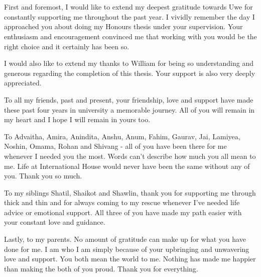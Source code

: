 \chapter*{}

First and foremost, I would like to extend my deepest gratitude towards Uwe for constantly supporting me throughout the past year. I vividly remember the day I approached you about doing my Honours thesis under your supervision. Your enthusiasm and encouragement convinced me that working with you would be the right choice and it certainly has been so. 

I would also like to extend my thanks to William for being so understanding and generous regarding the completion of this thesis. Your support is also very deeply appreciated.

To all my friends, past and present, your friendship, love and support have made these past four years in university a memorable journey. All of you will remain in my heart and I hope I will remain in yours too.

To Advaitha, Amira, Anindita, Anshu, Anum, Fahim, Gaurav, Jai, Lamiyea, Noshin, Omama, Rohan and Shivang - all of you have been there for me whenever I needed you the most. Words can't describe how much you all mean to me. Life at International House would never have been the same without any of you. Thank you so much. 

To my siblings Shatil, Shaikot and Shawlin, thank you for supporting me through thick and thin and for always coming to my rescue whenever I've needed life advice or emotional support. All three of you have made my path easier with your constant love and guidance. 

Lastly, to my parents. No amount of gratitude can make up for what you have done for me. I am who I am simply because of your upbringing and unwavering love and support. You both mean the world to me. Nothing has made me happier than making the both of you proud. Thank you for everything. 